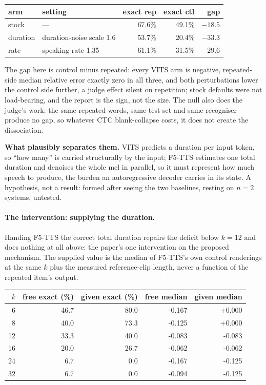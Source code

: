 \begin{center}
\begin{tabular}{llrrr}
\toprule
arm & setting & exact rep & exact ctl & gap \\
\midrule
stock     & ---                       & 67.6\% & 49.1\% & $-18.5$ \\
duration  & duration-noise scale 1.6  & 53.7\% & 20.4\% & $-33.3$ \\
rate      & speaking rate 1.35        & 61.1\% & 31.5\% & $-29.6$ \\
\bottomrule
\end{tabular}
\end{center}

\noindent The gap here is control minus repeated: every VITS arm is
negative, repeated-side median relative error exactly zero in all
three, and both perturbations lower the control side further, a judge
effect silent on repetition; stock defaults were not load-bearing, and
the report is the sign, not the size. The null also does the judge's
work: the same repeated words, same test set and same recogniser
produce no gap, so whatever CTC blank-collapse costs, it does not
create the dissociation.

\noindent\textbf{What plausibly separates them.} VITS predicts a
duration per input token, so ``how many'' is carried structurally by
the input; F5-TTS estimates one total duration and denoises the whole
mel in parallel, so it must represent how much speech to produce, the
burden an autoregressive decoder carries in its state. A hypothesis,
not a result: formed after seeing the two baselines, resting on $n=2$
systems, untested.

\paragraph{The intervention: supplying the duration.} Handing F5-TTS
the correct total duration repairs the deficit below $k=12$ and does
nothing at all above: the paper's one intervention on the proposed
mechanism. The supplied value is the median of F5-TTS's own control
renderings at the same $k$ plus the measured reference-clip length,
never a function of the repeated item's output.

\begin{center}
\begin{tabular}{rrrrr}
\toprule
$k$ & free exact (\%) & given exact (\%) & free median & given median \\
\midrule
6 & 46.7 & 80.0 & -0.167 & +0.000 \\
8 & 40.0 & 73.3 & -0.125 & +0.000 \\
12 & 33.3 & 40.0 & -0.083 & -0.083 \\
16 & 20.0 & 26.7 & -0.062 & -0.062 \\
24 & 6.7 & 0.0 & -0.167 & -0.125 \\
32 & 6.7 & 0.0 & -0.094 & -0.125 \\
\bottomrule
\end{tabular}
\end{center}

